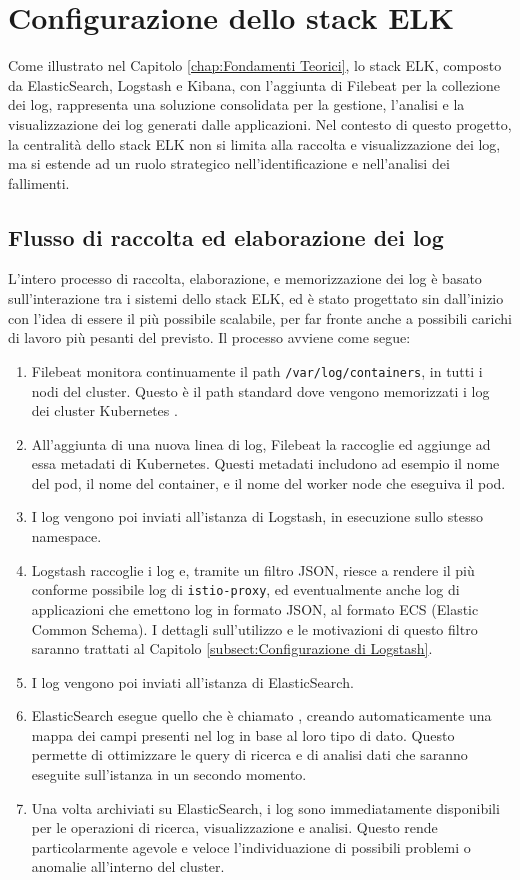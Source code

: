 \section{Configurazione dello stack ELK}

Come illustrato nel Capitolo \ref{chap:Fondamenti Teorici}, lo stack ELK, composto da ElasticSearch, Logstash e Kibana, con l'aggiunta di Filebeat per la collezione dei log, rappresenta una soluzione consolidata per la gestione, l'analisi e la visualizzazione dei log generati dalle applicazioni. Nel contesto di questo progetto, la centralità dello stack ELK non si limita alla raccolta e visualizzazione dei log, ma si estende ad un ruolo strategico nell'identificazione e nell'analisi dei fallimenti.

\subsection{Flusso di raccolta ed elaborazione dei log}
L'intero processo di raccolta, elaborazione, e memorizzazione dei log è basato sull'interazione tra i sistemi dello stack ELK, ed è stato progettato sin dall'inizio con l'idea di essere il più possibile scalabile, per far fronte anche a possibili carichi di lavoro più pesanti del previsto. Il processo avviene come segue:
\begin{enumerate}
\item Filebeat monitora continuamente il path \verb|/var/log/containers|, in tutti i nodi del cluster. Questo è il path standard dove vengono memorizzati i log dei cluster Kubernetes \cite{kubernetes_log_location}.
\item All'aggiunta di una nuova linea di log, Filebeat la raccoglie ed aggiunge ad essa metadati di Kubernetes. Questi metadati includono ad esempio il nome del pod, il nome del container, e il nome del worker node che eseguiva il pod.
\item I log vengono poi inviati all'istanza di Logstash, in esecuzione sullo stesso namespace.
\item Logstash raccoglie i log e, tramite un filtro JSON, riesce a rendere il più conforme possibile log di \verb|istio-proxy|, ed eventualmente anche log di applicazioni che emettono log in formato JSON, al formato ECS (Elastic Common Schema). I dettagli sull'utilizzo e le motivazioni di questo filtro saranno trattati al Capitolo \ref{subsect:Configurazione di Logstash}.
\item I log vengono poi inviati all'istanza di ElasticSearch.
\item ElasticSearch esegue quello che è chiamato , creando automaticamente una mappa dei campi presenti nel log in base al loro tipo di dato. Questo permette di ottimizzare le query di ricerca e di analisi dati che saranno eseguite sull'istanza in un secondo momento.
\item Una volta archiviati su ElasticSearch, i log sono immediatamente disponibili per le operazioni di ricerca, visualizzazione e analisi. Questo rende particolarmente agevole e veloce l'individuazione di possibili problemi o anomalie all'interno del cluster.
\end{enumerate}
